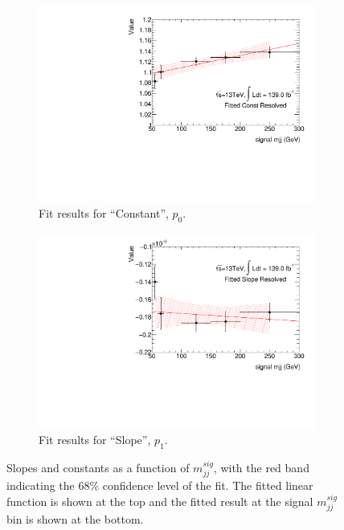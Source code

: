 \begin{figure}[ht]
    \centering
    \begin{subfigure}[b]{0.45\textwidth}
        \centering
        \includegraphics[width=\textwidth]{figures/mjjreweight1lep/fitCResMC16T.pdf}
        \caption{Fit results for ``Constant'', $p_0$.}
        \label{fig:fitCRes}
    \end{subfigure}
    \hfill
    \begin{subfigure}[b]{0.45\textwidth}
        \centering
        \includegraphics[width=\textwidth]{figures/mjjreweight1lep/fitSResMC16T.pdf}
        \caption{Fit results for ``Slope'', $p_1$.}
        \label{fig:fitSRes}
    \end{subfigure}
    \caption{Slopes and constants as a function of \(m_{jj}^{sig}\), with the red band indicating the 68\% confidence level of the fit. The fitted linear function is shown at the top and the fitted result at the signal \(m_{jj}^{sig}\) bin is shown at the bottom.}
    \label{fig:mjjReweight1LepResFit}
\end{figure}

